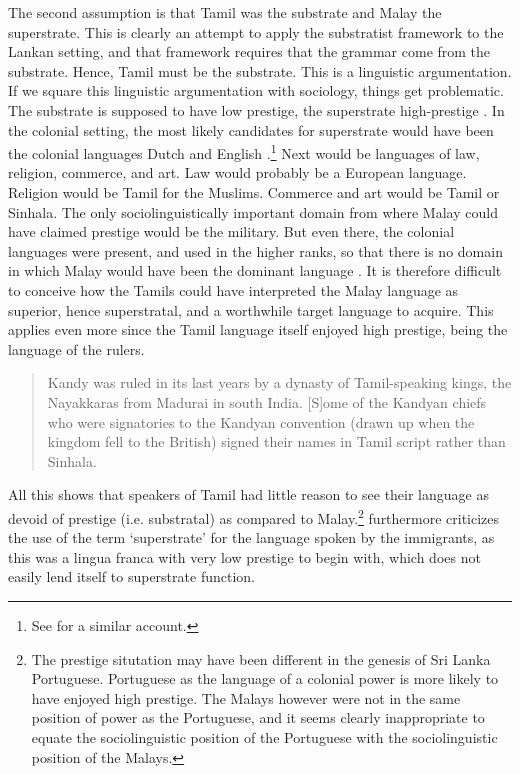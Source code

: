 The second assumption is that Tamil was the substrate and Malay the superstrate. This is clearly an attempt to apply the substratist framework to the Lankan setting, and that framework requires that the grammar come from the substrate. Hence, Tamil must be the substrate. This is a linguistic argumentation. If we square this linguistic argumentation with sociology, things get problematic. The substrate is supposed to have low prestige, the superstrate high-prestige \citep[99]{ArendsEtAlEd1995pc}. In the colonial setting, the most likely candidates for superstrate would have been the colonial languages Dutch and English \citep{Ansaldo2005ms,Ansaldo2008genesis}.\footnote{See \citet[25]{Saldin2001} for a similar account.} Next would be languages of law, religion, commerce, and art. Law would probably be  a European language. Religion would be Tamil for the Muslims. Commerce and art would be Tamil or Sinhala. The only sociolinguistically important domain from where Malay could have claimed prestige would be the military. But even there, the colonial languages were present, and used in the higher ranks, so that there is no domain in which Malay would have been the dominant language \citep{Ansaldo2008genesis}.
It is therefore difficult to conceive how the Tamils could have interpreted the Malay language as superior, hence superstratal, and a worthwhile target language to acquire. This applies even more since the Tamil language itself enjoyed high prestige, being the language of the rulers.

\begin{quote}
Kandy was ruled in its last years by a dynasty of Tamil-speaking kings, the Nayakkaras from Madurai in south India.  \el{}
[S]ome of the Kandyan chiefs who were signatories to the Kandyan convention (drawn up when the kingdom fell to the British)
 signed their names in Tamil script rather than Sinhala. \citep[23f]{NissanEtAl1990}
\end{quote}

All this shows that speakers of Tamil had little reason to see their language as devoid of prestige (i.e. substratal) as compared to Malay.\footnote{The prestige situtation may have been different in the genesis of Sri Lanka Portuguese. Portuguese as the language of a colonial power is more likely to have enjoyed high prestige. The Malays however were not in the same position of power as the Portuguese, and it seems clearly inappropriate to equate the sociolinguistic position of the Portuguese with the sociolinguistic position of the Malays.} \citet{Ansaldo2008genesis} furthermore criticizes the use of the term `superstrate' for the language spoken by the immigrants, as this was  a lingua franca with very low prestige to begin with, which does not easily lend itself to superstrate function.

